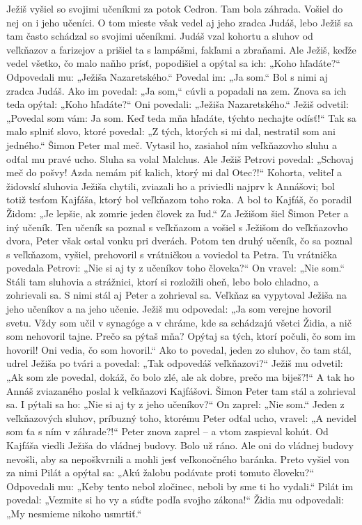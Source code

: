 Ježiš vyšiel so svojimi učeníkmi za potok Cedron. Tam bola záhrada. Vošiel do nej on i jeho učeníci. 
O tom mieste však vedel aj jeho zradca Judáš, lebo Ježiš sa tam často schádzal so svojimi učeníkmi. Judáš vzal kohortu a sluhov od veľkňazov a farizejov a prišiel ta s lampášmi, fakľami a zbraňami. Ale Ježiš, keďže vedel všetko, čo malo naňho prísť, popodišiel a opýtal sa ich: „Koho hľadáte?“ 
Odpovedali mu: „Ježiša Nazaretského.“ Povedal im: „Ja som.“ Bol s nimi aj zradca Judáš. Ako im povedal: „Ja som,“ cúvli a popadali na zem. Znova sa ich teda opýtal: „Koho hľadáte?“ Oni povedali: „Ježiša Nazaretského.“ Ježiš odvetil: „Povedal som vám: Ja som. Keď teda mňa hľadáte, týchto nechajte odísť!“ Tak sa malo splniť slovo, ktoré povedal: „Z tých, ktorých si mi dal, nestratil som ani jedného.“ Šimon Peter mal meč. Vytasil ho, zasiahol ním veľkňazovho sluhu a odťal mu pravé ucho. Sluha sa volal Malchus. Ale Ježiš Petrovi povedal: „Schovaj meč do pošvy! Azda nemám piť kalich, ktorý mi dal Otec?!“
\versseparator
Kohorta, veliteľ a židovskí sluhovia Ježiša chytili, zviazali ho 
a priviedli najprv k Annášovi; bol totiž tesťom Kajfáša, ktorý bol veľkňazom toho roka. A bol to Kajfáš, čo poradil Židom: „Je lepšie, ak zomrie jeden človek za ľud.“
Za Ježišom šiel Šimon Peter a iný učeník. Ten učeník sa poznal s veľkňazom a vošiel s Ježišom do veľkňazovho dvora, Peter však ostal vonku pri dverách. Potom ten druhý učeník, čo sa poznal s veľkňazom, vyšiel, prehovoril s vrátničkou a voviedol ta Petra. Tu vrátnička povedala Petrovi: „Nie si aj ty z učeníkov toho človeka?“ On vravel: „Nie som.“ Stáli tam sluhovia a strážnici, ktorí si rozložili oheň, lebo bolo chladno, a zohrievali sa. S nimi stál aj Peter a zohrieval sa.
Veľkňaz sa vypytoval Ježiša na jeho učeníkov a na jeho učenie. Ježiš mu odpovedal: „Ja som verejne hovoril svetu. Vždy som učil v synagóge a v chráme, kde sa schádzajú všetci Židia, a nič som nehovoril tajne. Prečo sa pýtaš mňa? Opýtaj sa tých, ktorí počuli, čo som im hovoril! Oni vedia, čo som hovoril.“ Ako to povedal, jeden zo sluhov, čo tam stál, udrel Ježiša po tvári a povedal: „Tak odpovedáš veľkňazovi?“ Ježiš mu odvetil: „Ak som zle povedal, dokáž, čo bolo zlé, ale ak dobre, prečo ma biješ?!“ A tak ho Annáš zviazaného poslal k veľkňazovi Kajfášovi.
Šimon Peter tam stál a zohrieval sa. I pýtali sa ho: „Nie si aj ty z jeho učeníkov?“ On zaprel: „Nie som.“ Jeden z veľkňazových sluhov, príbuzný toho, ktorému Peter odťal ucho, vravel: „A nevidel som ťa s ním v záhrade?!“ Peter znova zaprel – a vtom zaspieval kohút.
\versseparator
Od Kajfáša viedli Ježiša do vládnej budovy. Bolo už ráno. Ale oni do vládnej budovy nevošli, aby sa nepoškvrnili a mohli jesť veľkonočného baránka. Preto vyšiel von za nimi Pilát a opýtal sa: „Akú žalobu podávate proti tomuto človeku?“ Odpovedali mu: „Keby tento nebol zločinec, neboli by sme ti ho vydali.“ Pilát im povedal: „Vezmite si ho vy a súďte podľa svojho zákona!“ Židia mu odpovedali: „My nesmieme nikoho usmrtiť.“ 
